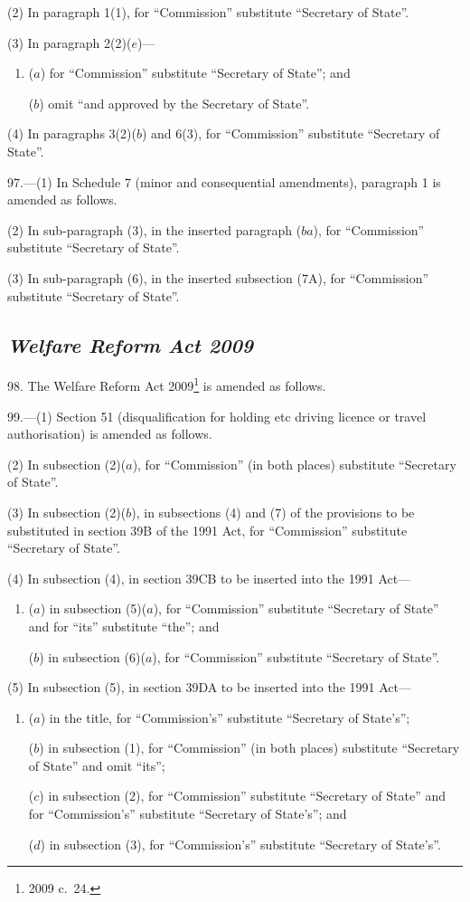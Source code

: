 \documentclass[12pt,a4paper]{article}
\begin{document}
(2) In paragraph 1(1), for “Commission” substitute “Secretary of State”.

(3) In paragraph 2(2)($e$)—
\begin{enumerate}\item[]
($a$) for “Commission” substitute “Secretary of State”; and

($b$) omit “and approved by the Secretary of State”.
\end{enumerate}

(4) In paragraphs 3(2)($b$)  and 6(3), for “Commission” substitute “Secretary of State”.

\medskip

97.---(1)  In Schedule 7 (minor and consequential amendments), paragraph 1 is amended as follows.

(2) In sub-paragraph (3), in the inserted paragraph ($ba$), for “Commission” substitute “Secretary of State”.

(3) In sub-paragraph (6), in the inserted subsection (7A), for “Commission” substitute “Secretary of State”.

\subsection*{\itshape Welfare Reform Act 2009}

98.  The Welfare Reform Act 2009\footnote{2009 c.~24.} is amended as follows.

\medskip

99.---(1)  Section 51 (disqualification for holding etc driving licence or travel authorisation) is amended as follows.

(2) In subsection (2)($a$), for “Commission” (in both places) substitute “Secretary of State”.

(3) In subsection (2)($b$), in subsections (4) and (7) of the provisions to be substituted in section 39B of the 1991 Act, for “Commission” substitute “Secretary of State”.

(4) In subsection (4), in section 39CB to be inserted into the 1991 Act—
\begin{enumerate}\item[]
($a$) in subsection (5)($a$), for “Commission” substitute “Secretary of State” and for “its” substitute “the”; and

($b$) in subsection (6)($a$), for “Commission” substitute “Secretary of State”.
\end{enumerate}

(5) In subsection (5), in section 39DA to be inserted into the 1991 Act—
\begin{enumerate}\item[]
($a$) in the title, for “Commission’s” substitute “Secretary of State’s”;

($b$) in subsection (1), for “Commission” (in both places) substitute “Secretary of State” and omit “its”;

($c$) in subsection (2), for “Commission” substitute “Secretary of State” and for “Commission’s” substitute “Secretary of State’s”; and

($d$) in subsection (3), for “Commission’s” substitute “Secretary of State’s”.
\end{enumerate}
\end{document}
